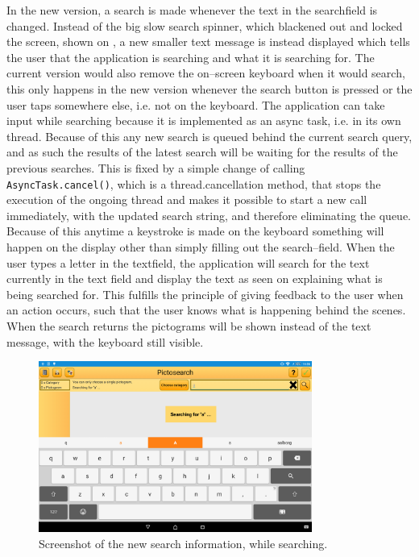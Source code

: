 In the new version, a search is made whenever the text in the searchfield is changed.
Instead of the big slow search spinner, which blackened out and locked the screen, shown on , a new smaller text message is instead displayed which tells the user that the application is searching and what it is searching for.
The current version would also remove the on--screen keyboard when it would search, this only happens in the new version whenever the search button is pressed or the user taps somewhere else, i.e. not on the keyboard.
The application can take input while searching because it is implemented as an async task, i.e. in its own thread.
Because of this any new search is queued behind the current search query, and as such the results of the latest search will be waiting for the results of the previous searches.
This is fixed by a simple change of calling \texttt{AsyncTask.cancel()}, which is a thread.cancellation method, that stops the execution of the ongoing thread and makes it possible to start a new call immediately, with the updated search string, and therefore eliminating the queue.
Because of this anytime a keystroke is made on the keyboard something will happen on the display other than simply filling out the search--field.
When the user types a letter in the textfield, the application will search for the text currently in the text field and display the text as seen on  explaining what is being searched for.
This fulfills the principle of giving feedback to the user when an action occurs, such that the user knows what is happening behind the scenes.
When the search returns the pictograms will be shown instead of the text message, with the keyboard still visible.

\begin{figure}[htb]
    \centering
    \includegraphics[width=0.8\textwidth]{figures/img/screenshots/new_dialog.png}
    \caption{Screenshot of the new search information, while searching.}\label{fig:screenshot_newsearch}
\end{figure}

